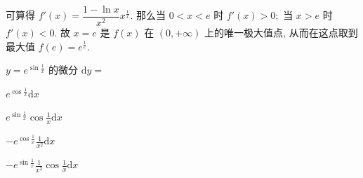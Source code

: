\begin{solution}
  可算得 $\displaystyle f'(x) = \dfrac{1 - \ln x}{x^2} x^{\frac{1}{x}}.$ 那么当 $0 < x < e$ 时 $f'(x) > 0;$ 当 $x > e$ 时 $f'(x) < 0.$ 故 $x = e$ 是 $f(x)$ 在 $(0, +\infty)$ 上的唯一极大值点, 从而在这点取到最大值 $f(e) = e^{\frac{1}{e}}.$
\end{solution}








\begin{question}
  $y = e^{\sin \frac{1}{x}}$ 的微分 $\mathrm{d} y =$ \paren[D]

  \begin{choices}
      \item $e^{\cos \frac{1}{x}} \mathrm{d} x$
      \item $e^{\sin \frac{1}{x}} \cos \frac{1}{x} \mathrm{d} x$
      \item $-e^{\cos \frac{1}{x}} \frac{1}{x^2} \mathrm{d} x$
      \item $-e^{\sin \frac{1}{x}} \frac{1}{x^2} \cos \frac{1}{x} \mathrm{d} x$
  \end{choices}
\end{question}

